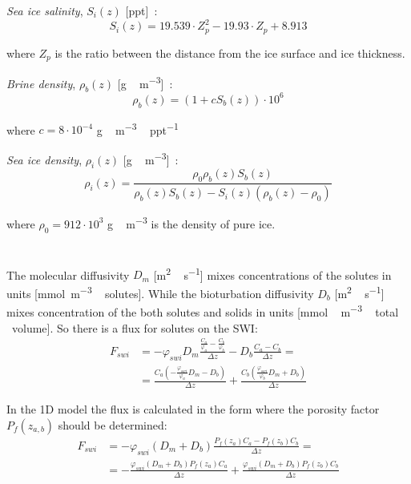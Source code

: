\documentclass[gmd, manuscript]{copernicus}
\begin{document}
\emph{Sea ice salinity}, $S_{i}(z)$ [\unit{ppt}]~\citep{Gerland1999, Duarte2015}:
\begin{equation}
    S_{i}(z) = 19.539 \cdot Z_{p}^{2}
             - 19.93  \cdot Z_{p}
             + 8.913
\end{equation}

where $Z_{p}$ is the ratio between the distance from the ice surface and ice thickness.

\emph{Brine density}, $\rho_{b}(z)$ [\unit{g\,m^{-3}}]~\citep{Cox1975}:
\begin{equation}
    \rho_{b}(z) = (1 + c S_{b}(z)) \cdot 10^{6}
\end{equation}

where $c = 8 \cdot 10^{-4}$ \unit{g\,m^{-3}\,ppt^{-1}}

\emph{Sea ice density}, $\rho_{i}(z)$ [\unit{g\,m^{-3}}]~\citep{Arrigo1993}:
\begin{equation}
    \rho_{i}(z) = \frac
    {\rho_{0} \rho_{b}(z) S_{b}(z)}
    {\rho_{b}(z) S_{b}(z) - S_{i}(z)
    (\rho_{b}(z) - \rho_{0})}
\end{equation}

where $\rho_{0} = 912 \cdot 10^{3}$ \unit{g\,m^{-3}} is the density of pure ice.

\section{}    %
\label{app:B}

The molecular diffusivity $D_{m}$ [\unit{m^{2}\,s^{-1}}] mixes concentrations of the solutes in units [\unit{mmol m^{-3}\,solutes}].
While the bioturbation diffusivity $D_{b}$ [\unit{m^{2}\,s^{-1}}] mixes concentration of the both solutes and solids in units [\unit{mmol\,m^{-3}\,total\,volume}].
So there is a flux for solutes on the \textrm{SWI}:
\begin{align}
    F_{swi} &= - \varphi_{swi} D_{m} \frac{\frac{C_{a}}{\varphi_{a}} - \frac{C_{b}}{\varphi_{b}}} {\Delta z}
    - D_{b} \frac{C_{a} - C_{b}}{\Delta z} = \\
    &= \frac{C_{a}(- \frac{\varphi_{swi}}{\varphi_{a}} D_{m} - D_{b})}{\Delta z}
    + \frac{C_{b}(  \frac{\varphi_{swi}}{\varphi_{b}} D_{m} + D_{b})}{\Delta z}
    \label{eq:b1}
\end{align}

In the 1D model the flux is calculated in the form where the porosity factor $P_{f}(z_{a,b})$ should be determined:
\begin{align}
    F_{swi} &= - \varphi_{swi}(D_{m} + D_{b})
    \frac{P_{f}(z_{a}) C_{a} - P_{f}(z_{b}) C_{b}}{\Delta z} = \\
    &= - \frac{\varphi_{swi}(D_{m} + D_{b})P_{f}(z_{a}) C_{a}}{\Delta z}
    + \frac{\varphi_{swi}(D_{m} + D_{b})P_{f}(z_{b}) C_{b}}{\Delta z}
    \label{eq:b2}
\end{align}
\end{document}
